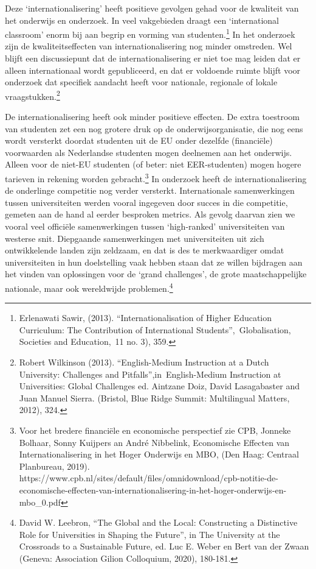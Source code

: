 \documentclass{jote-book}
\begin{document}
	Deze ‘internationalisering' heeft positieve gevolgen gehad voor de kwaliteit van het onderwijs en onderzoek. In veel vakgebieden draagt een ‘international classroom' enorm bij aan begrip en vorming van studenten.\footnote{Erlenawati Sawir, (2013). “Internationalisation of Higher Education Curriculum: The Contribution of International Students”, Globalisation, Societies and Education, 11 no. 3), 359. } In het onderzoek zijn de kwaliteitseffecten van internationalisering nog minder omstreden. Wel blijft een discussiepunt dat de internationalisering er niet toe mag leiden dat er alleen internationaal wordt gepubliceerd, en dat er voldoende ruimte blijft voor onderzoek dat specifiek aandacht heeft voor nationale, regionale of lokale vraagstukken.\footnote{Robert Wilkinson (2013). “English-Medium Instruction at a Dutch University: Challenges and Pitfalls”,in English-Medium Instruction at Universities: Global Challenges ed. Aintzane Doiz, David Lasagabaster and Juan Manuel Sierra. (Bristol, Blue Ridge Summit: Multilingual Matters, 2012), 324. }



	De internationalisering heeft ook minder positieve effecten. De extra toestroom van studenten zet een nog grotere druk op de onderwijsorganisatie, die nog eens wordt versterkt doordat studenten uit de EU onder dezelfde (financiële) voorwaarden als Nederlandse studenten mogen deelnemen aan het onderwijs. Alleen voor de niet-EU studenten (of beter: niet EER-studenten) mogen hogere tarieven in rekening worden gebracht.\footnote{Voor het bredere financiële en economische perspectief zie CPB, Jonneke Bolhaar, Sonny Kuijpers an André Nibbelink, Economische Effecten van Internationalisering in het Hoger Onderwijs en MBO, (Den Haag: Centraal Planbureau, 2019). https://www.cpb.nl/sites/default/files/omnidownload/cpb-notitie-de-economische-effecten-van-internationalisering-in-het-hoger-onderwijs-en-mbo\_0.pdf} In onderzoek heeft de internationalisering de onderlinge competitie nog verder versterkt. Internationale samenwerkingen tussen universiteiten werden vooral ingegeven door succes in die competitie, gemeten aan de hand al eerder besproken metrics. Als gevolg daarvan zien we vooral veel officiële samenwerkingen tussen ‘high-ranked' universiteiten van westerse snit. Diepgaande samenwerkingen met universiteiten uit zich ontwikkelende landen zijn zeldzaam, en dat is des te merkwaardiger omdat universiteiten in hun doelstelling vaak hebben staan dat ze willen bijdragen aan het vinden van oplossingen voor de ‘grand challenges', de grote maatschappelijke nationale, maar ook wereldwijde problemen.\footnote{David W. Leebron, “The Global and the Local: Constructing a Distinctive Role for Universities in Shaping the Future”, in The University at the Crossroads to a Sustainable Future, ed. Luc E. Weber en Bert van der Zwaan (Geneva: Association Gilion Colloquium, 2020), 180-181.}
\end{document}
